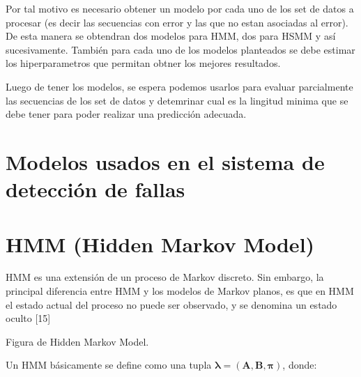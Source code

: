 Por tal motivo es necesario obtener un modelo por cada uno de los set de datos a procesar (es decir las secuencias con error y las que no estan asociadas al error). De esta manera se obtendran dos modelos para HMM, dos para HSMM y así sucesivamente. También para cada uno de los modelos planteados se debe estimar los hiperparametros que permitan obtner los mejores resultados. 


Luego de tener los modelos, se espera podemos usarlos para evaluar parcialmente las secuencias de los set de datos y detemrinar cual es la lingitud minima que se debe tener para poder realizar una predicción adecuada.




\section{Modelos usados en el sistema de detección de fallas} %
\label{section2.5}

\section*{HMM (Hidden Markov Model) }

HMM es una extensi\'on de un proceso de Markov discreto. Sin embargo, la principal diferencia entre HMM y los modelos de Markov planos, es que en HMM el estado actual del proceso no puede ser observado, y se denomina un estado oculto [15]

Figura de Hidden Markov Model.

Un HMM b\'asicamente se define como una tupla $\boldsymbol\lambda = (\textbf{A},\textbf{B},\boldsymbol\pi)$, donde:

